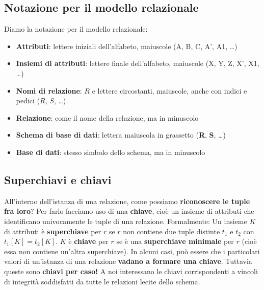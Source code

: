 \documentclass[12pt]{article}
\begin{document}
\subsection{Notazione per il modello relazionale}
Diamo la notazione per il modello relazionale:
\begin{itemize}
    \item \textbf{Attributi}: lettere iniziali dell'alfabeto, maiuscole (A, B, C, A', A1, \dots)
    \item \textbf{Insiemi di attributi}: lettere finale dell'alfabeto, maiuscole (X, Y, Z, X', X1, \dots)
    \item \textbf{Nomi di relazione}: $R$ e lettere circostanti, maiuscole, anche con indici e pedici ($R$, $S$, \dots)
    \item \textbf{Relazione}: come il nome della relazione, ma in minuscolo
    \item \textbf{Schema di base di dati}: lettera maiuscola in grassetto (\textbf{R}, \textbf{S}, \dots)
    \item \textbf{Base di dati}: stesso simbolo dello schema, ma in minuscolo
\end{itemize}
\subsection{Superchiavi e chiavi}
All'interno dell'istanza di una relazione, come possiamo \textbf{riconoscere le tuple fra loro}?
Per farlo facciamo uso di una \textbf{chiave}, cioè un insieme di attributi che identificano univocamente le tuple di una relazione.
Formalmente: \newline
Un insieme $K$ di attributi è \textbf{superchiave} per $r$ se $r$ non contiene due tuple distinte $t_1$ e $t_2$ con $t_1[K] = t_2[K]$. \newline
$K$ è \textbf{chiave} per $r$ se è una \textbf{superchiave minimale} per $r$ (cioè essa non contiene un'altra superchiave). \newline
In alcuni casi, può essere che i particolari valori di un'istanza di una relazione \textbf{vadano a formare una chiave}.
Tuttavia queste sono \textbf{chiavi per caso!} A noi interessano le chiavi corrispondenti a vincoli di integrità soddisfatti da tutte le relazioni lecite dello schema.
\end{document}
